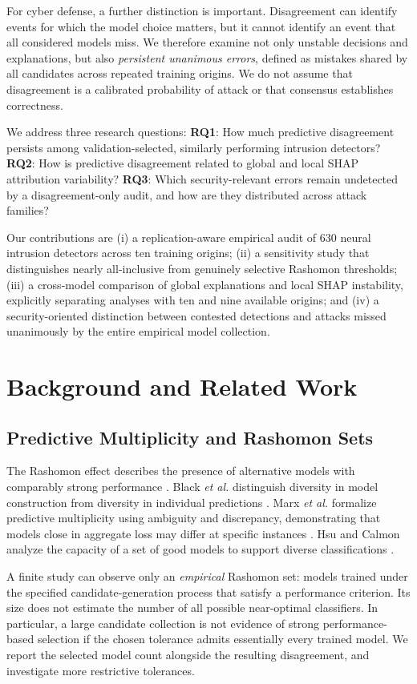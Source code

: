 \documentclass[10pt,conference]{IEEEtran}
\begin{document}
For cyber defense, a further distinction is important. Disagreement can identify events for which the model choice matters, but it cannot identify an event that all considered models miss. We therefore examine not only unstable decisions and explanations, but also \emph{persistent unanimous errors}, defined as mistakes shared by all candidates across repeated training origins. We do not assume that disagreement is a calibrated probability of attack or that consensus establishes correctness.

We address three research questions: \textbf{RQ1}: How much predictive disagreement persists among validation-selected, similarly performing intrusion detectors? \textbf{RQ2}: How is predictive disagreement related to global and local SHAP attribution variability? \textbf{RQ3}: Which security-relevant errors remain undetected by a disagreement-only audit, and how are they distributed across attack families?

Our contributions are (i) a replication-aware empirical audit of 630 neural intrusion detectors across ten training origins; (ii) a sensitivity study that distinguishes nearly all-inclusive from genuinely selective Rashomon thresholds; (iii) a cross-model comparison of global explanations and local SHAP instability, explicitly separating analyses with ten and nine available origins; and (iv) a security-oriented distinction between contested detections and attacks missed unanimously by the entire empirical model collection.

\section{Background and Related Work}
\subsection{Predictive Multiplicity and Rashomon Sets}
The Rashomon effect describes the presence of alternative models with comparably strong performance \cite{breiman2001}. Black \emph{et al.} distinguish diversity in model construction from diversity in individual predictions \cite{black2022}. Marx \emph{et al.} formalize predictive multiplicity using ambiguity and discrepancy, demonstrating that models close in aggregate loss may differ at specific instances \cite{marx2020}. Hsu and Calmon analyze the capacity of a set of good models to support diverse classifications \cite{hsu2022}.

A finite study can observe only an \emph{empirical} Rashomon set: models trained under the specified candidate-generation process that satisfy a performance criterion. Its size does not estimate the number of all possible near-optimal classifiers. In particular, a large candidate collection is not evidence of strong performance-based selection if the chosen tolerance admits essentially every trained model. We report the selected model count alongside the resulting disagreement, and investigate more restrictive tolerances.
\end{document}
